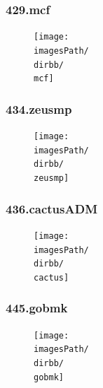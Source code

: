 \documentclass[12pt,a4paper]{article}
\newcommand{\imagesPath}{/home/nick/arch-ntua/ex02/graphs}
\newcommand{\mcf}{429.mcf.cslab_branch_predictors.out.pdf}
\newcommand{\zeusmp}{434.zeusmp.cslab_branch_predictors.out.pdf}
\newcommand{\cactus}{436.cactusADM.cslab_branch_predictors.out.pdf}
\newcommand{\gobmk}{445.gobmk.cslab_branch_predictors.out.pdf}
\newcommand{\dirbb}{4.2/ii}
\begin{document}
				\subsubsection{429.mcf}
					\begin{figure}[H]
						\begin{center}
							 \texttt{[image: \\imagesPath/\\dirbb/\\mcf]}
						\end{center}
					\end{figure}
				
				\subsubsection{434.zeusmp}
					\begin{figure}[H]
						\begin{center}
							 \texttt{[image: \\imagesPath/\\dirbb/\\zeusmp]}
						\end{center}
					\end{figure}
				
				\subsubsection{436.cactusADM}
					\begin{figure}[H]
						\begin{center}
							 \texttt{[image: \\imagesPath/\\dirbb/\\cactus]}
						\end{center}
					\end{figure}
				
				\subsubsection{445.gobmk}
					\begin{figure}[H]
						\begin{center}
							 \texttt{[image: \\imagesPath/\\dirbb/\\gobmk]}
						\end{center}
					\end{figure}
				
\end{document}
